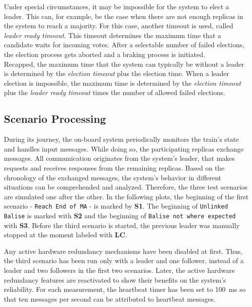 Under special circumstances, it may be impossible for the system to elect a leader.
This can, for example, be the case when there are not enough replicas in the system to reach a majority.
For this case, another timeout is used, called \textit{leader ready timeout}.
This timeout determines the maximum time that a candidate waits for incoming votes.
After a selectable number of failed elections, the election process gets aborted and a braking process is initiated.
\\

Recapped, the maximum time that the system can typically be without a leader is determined by the \textit{election timeout} plus the election time.
When a leader election is impossible, the maximum time is determined by the \textit{election timeout} plus the \textit{leader ready timeout} times the number of allowed failed elections.

\subsection{Scenario Processing}

During its journey, the on-board system periodically monitors the train's state and handles input messages.
While doing so, the participating replicas exchange messages.
All communication originates from the system's leader, that makes requests and receives responses from the remaining replicas.
Based on the chronology of the exchanged messages, the system's behavior in different situations can be comprehended and analyzed.
Therefore, the three test scenarios are simulated one after the other.
In the following plots, the beginning of the first scenario - \texttt{Reach End of MA} - is marked by \textbf{S1}.
The beginning of \texttt{Unlinked Balise} is marked with \textbf{S2} and the beginning of \texttt{Balise not where expected} with \textbf{S3}.
Before the third scenario is started, the previous leader was manually stopped at the moment labeled with \textbf{LC}.

Any active hardware redundancy mechanisms have been disabled at first.
Thus, the third scenario has been run only with a leader and one follower, instead of a leader and two followers in the first two scenarios.
Later, the active hardware redundancy features are reactivated to show their benefits on the system's reliability.
For each measurement, the heartbeat timer has been set to 100~ms so that ten messages per second can be attributed to heartbeat messages.
\\

